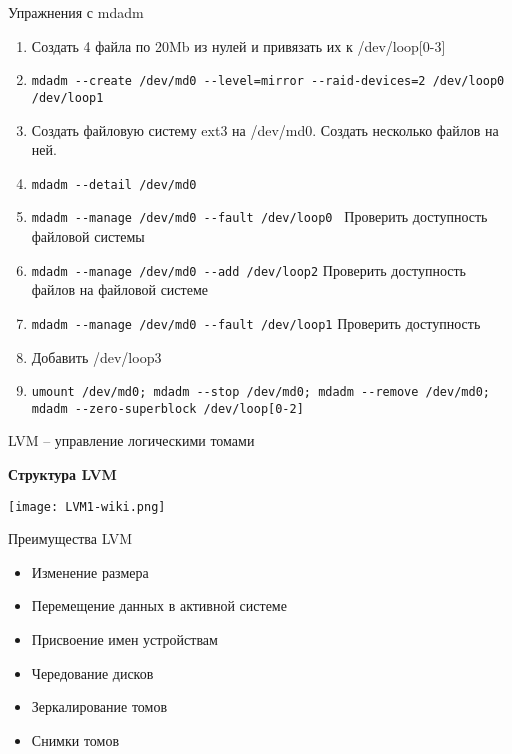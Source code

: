 \begin{frame}{Упражнения с mdadm}
    \begin{enumerate}
      \item Создать 4 файла по 20Mb из нулей и привязать их к /dev/loop[0-3]
      \item {\tt mdadm -\phantom{}-create /dev/md0 -\phantom{}-level=mirror -\phantom{}-raid-devices=2 /dev/loop0 /dev/loop1}
      \item Создать файловую систему ext3 на /dev/md0. Создать несколько файлов на ней.
      \item {\tt mdadm -\phantom{}-detail /dev/md0}
      \item {\tt mdadm -\phantom{}-manage /dev/md0 -\phantom{}-fault /dev/loop0 } Проверить доступность файловой системы
      \item {\tt mdadm -\phantom{}-manage /dev/md0 -\phantom{}-add /dev/loop2} Проверить доступность файлов на файловой системе
      \item {\tt mdadm -\phantom{}-manage /dev/md0 -\phantom{}-fault /dev/loop1} Проверить доступность
      \item Добавить /dev/loop3
      \item {\tt umount /dev/md0; mdadm -\phantom{}-stop /dev/md0; mdadm -\phantom{}-remove /dev/md0; mdadm -\phantom{}-zero-superblock /dev/loop[0-2]}
    \end{enumerate}
\end{frame}

\begin{frame}{LVM -- управление логическими томами}
  \begin{center}
    \textbf{Структура LVM}
  \end{center}
  \texttt{[image: LVM1-wiki.png]}
\end{frame}

\begin{frame}{Преимущества LVM}
	\begin{itemize}
		\item Изменение размера
		\item Перемещение данных в активной системе
		\item Присвоение имен устройствам
		\item Чередование дисков
		\item Зеркалирование томов
		\item Снимки томов
	\end{itemize}
\end{frame}
 
